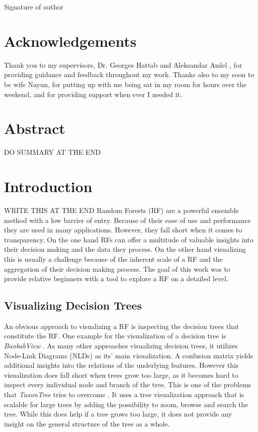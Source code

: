 \documentclass[a4paper, 12pt]{article}
\begin{document}
\noindent
Signature of author

\clearpage
\section{Acknowledgements}
Thank you to my supervisors, Dr. Georges Hattab and Aleksandar Anžel , for providing guidance and feedback throughout
my work. Thanks also to my soon to be wife Nayun, for putting up with me being sat in my room for hours over the weekend,
and for providing support when ever I needed it.

\clearpage
\section{Abstract}
DO SUMMARY AT THE END

\clearpage
\tableofcontents

\clearpage
\section{Introduction}
WRITE THIS AT THE END
Random Forests (RF) \cite{breiman2001random} are a powerful ensemble method with a low barrier of entry. Because of their
ease of use and performance they are used in many applications. However, they fall short
when it comes to transparency.
On the one hand RFs can offer a multitude of valuable insights into their decision making and the data they
process. On the other hand visualizing this is usually a challenge because of the inherent scale of a RF and the
aggregation of their decision making process. The goal of this work was to provide relative
beginners with a tool to explore a RF on a detailed level.

\subsection{Visualizing Decision Trees}
An obvious approach to visualizing a RF is inspecting the decision trees that constitute
the RF. One example for the visualization of a decision tree is \textit{BaobabView}
\cite{van2011baobabview}. As many other approaches visualizing decision trees, it utilizes
Node-Link Diagrams (NLDs) as its' main visualization. A confusion matrix yields additional
insights into the relations of the underlying features.
However this visualization does fall short when trees grow too large, as it becomes hard to
inspect every individual node and branch of the tree.
This is one of the problems that \textit{TaxonTree} tries to overcome
\cite{parr2003taxontree}. It uses a tree visualization approach that is scalable for large
trees by adding the possibility to zoom, browse and search the tree. While this does
help if a tree grows too large, it does not provide any insight on the general structure of
the tree as a whole. \par
\end{document}
